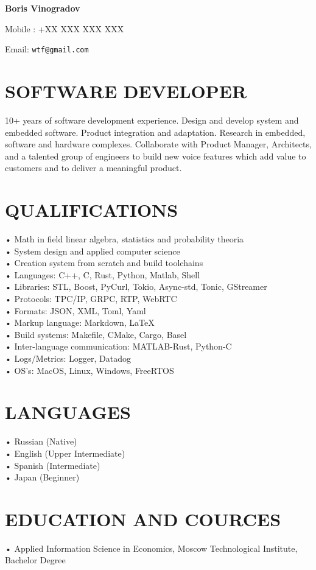 \documentclass{article}
\begin{document}
\textbf{Boris Vinogradov}

Mobile : +XX XXX XXX XXX

Email: \texttt{wtf@gmail.com}

\section{\textsf{SOFTWARE DEVELOPER}}
10+ years of software development experience. Design and develop system and embedded software. Product
integration and adaptation. Research in embedded, software and hardware complexes. Collaborate with Product
Manager, Architects, and a talented group of engineers to build new voice features which add value to customers
and to deliver a meaningful product.

\section{\textsf{QUALIFICATIONS}}
• Math in field linear algebra, statistics and probability theoria\\
• System design and applied computer science\\
• Creation system from scratch and build toolchains\\
• Languages: C++, C, Rust, Python, Matlab, Shell\\
• Libraries: STL, Boost, PyCurl, Tokio, Async-std, Tonic, GStreamer\\
• Protocols: TPC/IP, GRPC, RTP, WebRTC\\
• Formats: JSON, XML, Toml, Yaml\\
• Markup language: Markdown, \LaTeX\\
• Build systems: Makefile, CMake, Cargo, Basel\\
• Inter-language communication: MATLAB-Rust, Python-C\\
• Logs/Metrics: Logger, Datadog\\
• OS’s: MacOS, Linux, Windows, FreeRTOS

\section{\textsf{LANGUAGES}}
• Russian (Native)\\
• English (Upper Intermediate)\\
• Spanish (Intermediate)\\
• Japan (Beginner)

\section{\textsf{EDUCATION AND COURCES}}
• Applied Information Science in Economics, Moscow Technological Institute, Bachelor Degree
\end{document}
